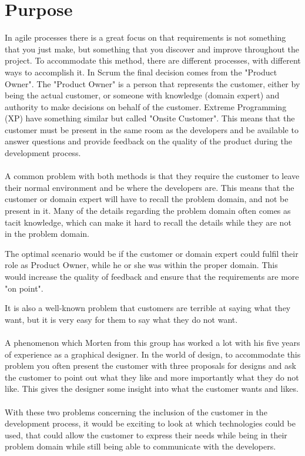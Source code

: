 \section{Purpose}
In agile processes there is a great focus on that requirements is not something that you just make, but something that you discover and improve throughout the project.
To accommodate this method, there are different processes, with different ways to accomplish it. 
In Scrum the final decision comes from the "Product Owner".
The "Product Owner" is a person that represents the customer, either by being the actual customer, or someone with knowledge (domain expert) and authority to make decisions on behalf of the customer. 
Extreme Programming (XP) have something similar but called "Onsite Customer".
This means that the customer must be present in the same room as the developers and be available to answer questions and provide feedback on the quality of the product during the development process. 
\\\\
A common problem with both methods is that they require the customer to leave their normal environment and be where the developers are. 
This means that the customer or domain expert will have to recall the problem domain, and not be present in it.
Many of the details regarding the problem domain often comes as tacit knowledge, which can make it hard to recall the details while they are not in the problem domain. 

The optimal scenario would be if the customer or domain expert could fulfil their role as Product Owner, while he or she was within the proper domain. 
This would increase the quality of feedback and ensure that the requirements are more "on point".

It is also a well-known problem that customers are terrible at saying what they want, but it is very easy for them to say what they do not want.
\\\\
A phenomenon which Morten from this group has worked a lot with his five years of experience as a graphical designer.
In the world of design, to accommodate this problem you often present the customer with three proposals for designs and ask the customer to point out what they like and more importantly what they do not like.
This gives the designer some insight into what the customer wants and likes. 
\\\\
With these two problems concerning the inclusion of the customer in the development process, it would be exciting to look at which technologies could be used, that could allow the customer to express their needs while being in their problem domain while still being able to communicate with the developers. 

